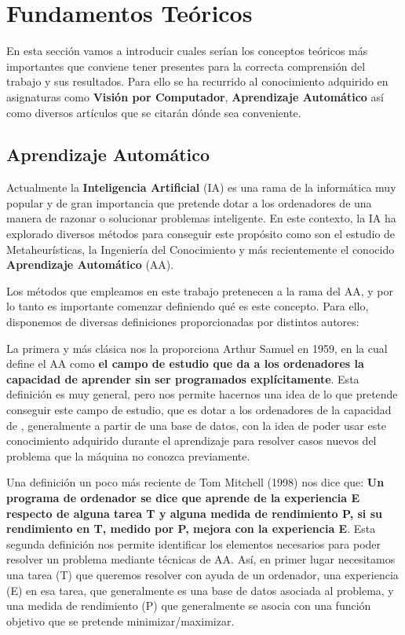 
\chapter{Fundamentos Teóricos}

En esta sección vamos a introducir cuales serían los conceptos teóricos más importantes que conviene tener presentes para la correcta comprensión del trabajo y sus resultados. Para ello se ha recurrido al conocimiento adquirido en asignaturas como \textbf{Visión por Computador}, \textbf{Aprendizaje Automático} así como diversos artículos que se citarán dónde sea conveniente.

\section{Aprendizaje Automático}
    \noindent Actualmente la \textbf{Inteligencia Artificial} (IA) es una rama de la informática muy popular y de gran importancia que pretende dotar a los ordenadores de una manera de razonar o solucionar problemas inteligente. En este contexto, la IA ha explorado diversos métodos para conseguir este propósito como son el estudio de Metaheurísticas, la Ingeniería del Conocimiento y más recientemente el conocido \textbf{Aprendizaje Automático} (AA). 
    
    \medskip

    \noindent Los métodos que empleamos en este trabajo pretenecen a la rama del AA, y por lo tanto es importante comenzar definiendo qué es este concepto. Para ello, disponemos de diversas definiciones proporcionadas por distintos autores: 

    \medskip

    \noindent La primera y más clásica nos la proporciona Arthur Samuel en 1959, en la cual define el AA como \textbf{el campo de estudio que da a los ordenadores la capacidad de aprender sin ser programados explícitamente}. Esta definición es muy general, pero nos permite hacernos una idea de lo que pretende conseguir este campo de estudio, que es dotar a los ordenadores de la capacidad de , generalmente a partir de una base de datos, con la idea de poder usar este conocimiento adquirido durante el aprendizaje para resolver casos nuevos del problema que la máquina no conozca previamente.
    
    \medskip

    \noindent Una definición un poco más reciente de Tom Mitchell (1998) nos dice que: \textbf{Un programa de ordenador se dice que aprende de la experiencia E respecto de alguna tarea T y alguna medida de rendimiento P, si su rendimiento en T, medido por P, mejora con la experiencia E}. Esta segunda definición nos permite identificar los elementos necesarios para poder resolver un problema mediante técnicas de AA. Así, en primer lugar necesitamos una tarea (T) que queremos resolver con ayuda de un ordenador, una experiencia (E) en esa tarea, que generalmente es una base de datos asociada al problema, y una medida de rendimiento (P) que generalmente se asocia con una función objetivo que se pretende minimizar/maximizar.

